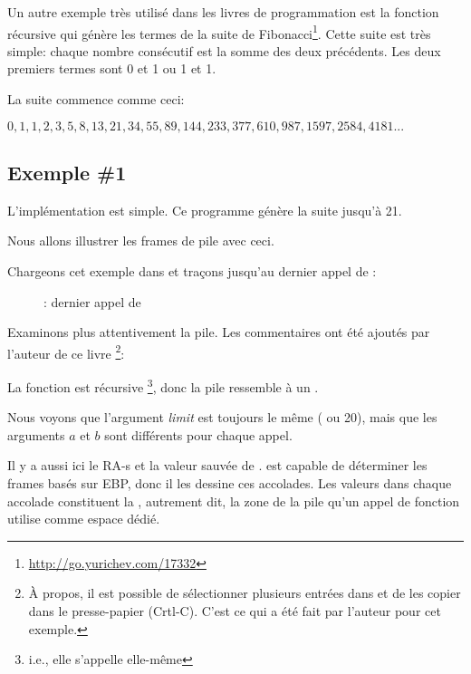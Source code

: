 
Un autre exemple très utilisé dans les livres de programmation est la fonction récursive
qui génère les termes de la suite de Fibonacci\footnote{\url{http://go.yurichev.com/17332}}.
Cette suite est très simple: chaque nombre consécutif est la somme des deux précédents.
Les deux premiers termes sont 0 et 1 ou 1 et 1.

La suite commence comme ceci:

\begin{center}
$0, 1, 1, 2, 3, 5, 8, 13, 21, 34, 55, 89, 144, 233, 377, 610, 987, 1597, 2584, 4181 ...$
\end{center}

\subsection{Exemple \#1}

L'implémentation est simple. Ce programme génère la suite jusqu'à 21.





Nous allons illustrer les frames de pile avec ceci.

\clearpage

Chargeons cet exemple dans \olly et traçons jusqu'au dernier appel de \ttf{}:

\begin{figure}[H]
\centering
{}
\caption{\olly: dernier appel de \ttf{}}
\label{fig:fib_olly}
\end{figure}

\clearpage
Examinons plus attentivement la pile.
Les commentaires ont été ajoutés par l'auteur de ce livre
\footnote{ À propos, il est possible de sélectionner plusieurs entrées dans \olly
et de les copier dans le presse-papier (Crtl-C).
C'est ce qui a été fait par l'auteur pour cet exemple.}:



La fonction est récursive \footnote{i.e., elle s'appelle elle-même}, donc la pile
ressemble à un .

Nous voyons que l'argument \emph{limit} est toujours le même ( ou 20), mais
que les arguments $a$ et $b$ sont différents pour chaque appel.

Il y a aussi ici le \ac{RA}-s et la valeur sauvée de \EBP.
\olly est capable de déterminer les frames basés sur EBP, donc il les dessine ces
accolades. Les valeurs dans chaque accolade constituent la ,
autrement dit, la zone de la pile qu'un appel de fonction utilise comme espace dédié.

